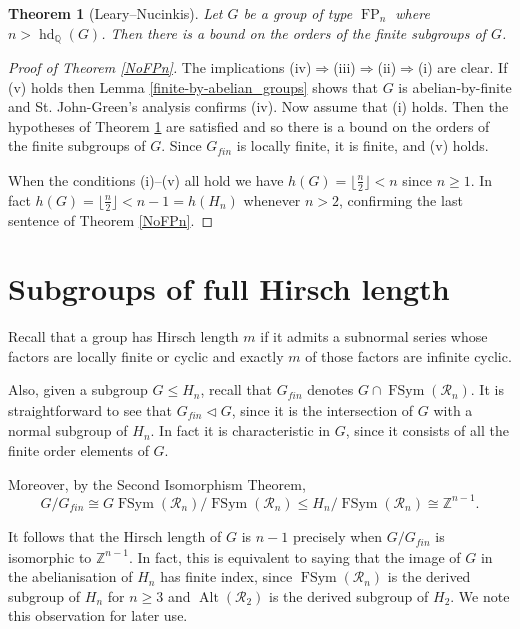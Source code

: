 \documentclass[11pt,a4paper]{amsart}
\newtheorem{theorem}{Theorem}[section]
\theoremstyle{definition}
\theoremstyle{remark}
\newcommand{\hd}{\operatorname{hd}}
\newcommand{\normal}{\lhd}
\newcommand{\FSym}{\operatorname{FSym}}
\newcommand{\Alt}{\operatorname{Alt}}
\newcommand{\Q}{\mathbb Q}
\newcommand{\Z}{\mathbb Z}
\newcommand{\Ra}{\mathcal{R}}
\newcommand{\FP}{\operatorname{FP}}
\renewcommand{\implies}{\Rightarrow}
\newcommand{\gfin}{G_{\textit{fin}}}
\begin{document}
\begin{theorem}[Leary--Nucinkis]\label{L--N}
Let $G$ be a group of type $\FP_n$ where $n>\hd_\Q(G)$. Then there is a bound on the orders of the finite subgroups of $G$.
\end{theorem}

\NoFPn




\begin{proof}[Proof of Theorem \ref{NoFPn}]
The implications (iv)$\implies$(iii)$\implies$(ii)$\implies$(i) are clear. 
If (v) holds then Lemma \ref{finite-by-abelian_groups} shows that $G$ is abelian-by-finite and St. John-Green's analysis \cite[Theorem 3.4]{Simon} confirms (iv).
Now assume that (i) holds. Then the hypotheses of Theorem \ref{L--N} are satisfied and so there is a bound on the orders of the finite subgroups of $G$. Since $\gfin$ is locally finite, it is finite, and (v) holds. 

When the conditions (i)--(v) all hold we have $h(G)=\lfloor\frac{n}{2}\rfloor<n$ since $n\ge1$. In fact $h(G)=\lfloor\frac{n}{2}\rfloor<n-1=h(H_n)$ whenever $n>2$, confirming the last sentence of
Theorem \ref{NoFPn}.
\end{proof}


\section{Subgroups of full Hirsch length}\label{sec:fullhirsch}

Recall that a group has Hirsch length $m$ if it admits a subnormal series whose factors are locally finite or cyclic and exactly $m$ of those factors are infinite cyclic. 

Also, given a subgroup $G \leq H_n$, recall that $\gfin$ denotes $G \cap \FSym(\Ra_n)$. It is straightforward to see that  $\gfin\normal G$, since it is the intersection of $G$ with a normal subgroup of $H_n$. In fact it is characteristic in $G$, since it consists of all the finite order elements of $G$. 

Moreover, by the Second Isomorphism Theorem, 
$$G/\gfin \cong G \FSym(\Ra_n) / \FSym(\Ra_n) \leq H_n / \FSym(\Ra_n) \cong \Z^{n-1}.$$ 

It follows that the Hirsch length of $G$ is $n-1$ precisely when $G/\gfin$ is isomorphic to $\Z^{n-1}$. In fact, this is equivalent to saying that the image of $G$ in the abelianisation of $H_n$ has finite index, since $\FSym(\Ra_n)$ is the derived subgroup of $H_n$ for $n \geq 3$ and $\Alt(\Ra_2)$ is the derived subgroup of $H_2$. We note this observation for later use. 
\end{document}
